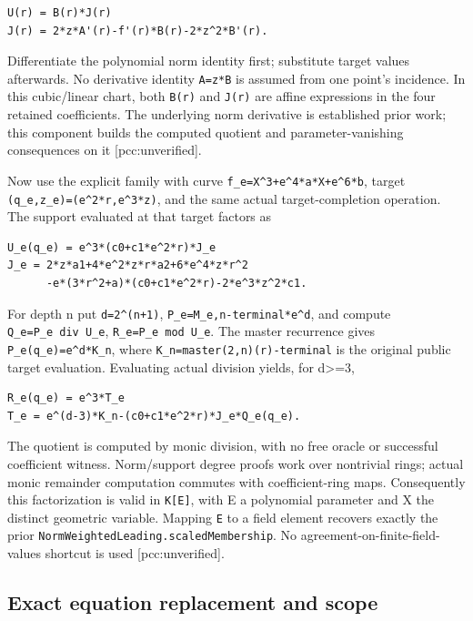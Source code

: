 \documentclass[
  10pt,
]{article}
\begin{document}
\begin{verbatim}
U(r) = B(r)*J(r)
J(r) = 2*z*A'(r)-f'(r)*B(r)-2*z^2*B'(r).
\end{verbatim}

Differentiate the polynomial norm identity first; substitute target
values afterwards. No derivative identity
\texttt{A\textquotesingle{}=z*B\textquotesingle{}} is assumed from one
point's incidence. In this cubic/linear chart, both \texttt{B(r)} and
\texttt{J(r)} are affine expressions in the four retained coefficients.
The underlying norm derivative is established prior work; this component
builds the computed quotient and parameter-vanishing consequences on it
{[}pcc:unverified{]}.

Now use the explicit family with curve
\texttt{f\_e=X\^{}3+e\^{}4*a*X+e\^{}6*b}, target
\texttt{(q\_e,z\_e)=(e\^{}2*r,e\^{}3*z)}, and the same actual
target-completion operation. The support evaluated at that target
factors as

\begin{verbatim}
U_e(q_e) = e^3*(c0+c1*e^2*r)*J_e
J_e = 2*z*a1+4*e^2*z*r*a2+6*e^4*z*r^2
      -e*(3*r^2+a)*(c0+c1*e^2*r)-2*e^3*z^2*c1.
\end{verbatim}

For depth n put \texttt{d=2\^{}(n+1)},
\texttt{P\_e=M\_e,n-terminal*e\^{}d}, and compute
\texttt{Q\_e=P\_e\ div\ U\_e}, \texttt{R\_e=P\_e\ mod\ U\_e}. The master
recurrence gives \texttt{P\_e(q\_e)=e\^{}d*K\_n}, where
\texttt{K\_n=master(2,n)(r)-terminal} is the original public target
evaluation. Evaluating actual division yields, for d\textgreater=3,

\begin{verbatim}
R_e(q_e) = e^3*T_e
T_e = e^(d-3)*K_n-(c0+c1*e^2*r)*J_e*Q_e(q_e).
\end{verbatim}

The quotient is computed by monic division, with no free oracle or
successful coefficient witness. Norm/support degree proofs work over
nontrivial rings; actual monic remainder computation commutes with
coefficient-ring maps. Consequently this factorization is valid in
\texttt{K{[}E{]}}, with E a polynomial parameter and X the distinct
geometric variable. Mapping \texttt{E} to a field element recovers
exactly the prior \texttt{NormWeightedLeading.scaledMembership}. No
agreement-on-finite-field-values shortcut is used {[}pcc:unverified{]}.

\subsection{Exact equation replacement and
scope}\label{exact-equation-replacement-and-scope}
\end{document}
